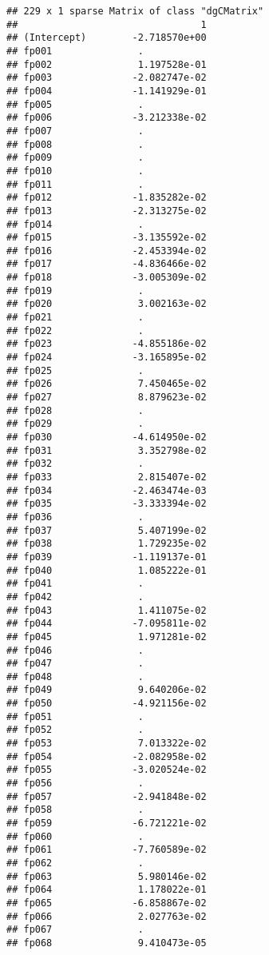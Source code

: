 \documentclass[]{article}
\begin{document}
\begin{verbatim}
## 229 x 1 sparse Matrix of class "dgCMatrix"
##                                1
## (Intercept)        -2.718570e+00
## fp001               .           
## fp002               1.197528e-01
## fp003              -2.082747e-02
## fp004              -1.141929e-01
## fp005               .           
## fp006              -3.212338e-02
## fp007               .           
## fp008               .           
## fp009               .           
## fp010               .           
## fp011               .           
## fp012              -1.835282e-02
## fp013              -2.313275e-02
## fp014               .           
## fp015              -3.135592e-02
## fp016              -2.453394e-02
## fp017              -4.836466e-02
## fp018              -3.005309e-02
## fp019               .           
## fp020               3.002163e-02
## fp021               .           
## fp022               .           
## fp023              -4.855186e-02
## fp024              -3.165895e-02
## fp025               .           
## fp026               7.450465e-02
## fp027               8.879623e-02
## fp028               .           
## fp029               .           
## fp030              -4.614950e-02
## fp031               3.352798e-02
## fp032               .           
## fp033               2.815407e-02
## fp034              -2.463474e-03
## fp035              -3.333394e-02
## fp036               .           
## fp037               5.407199e-02
## fp038               1.729235e-02
## fp039              -1.119137e-01
## fp040               1.085222e-01
## fp041               .           
## fp042               .           
## fp043               1.411075e-02
## fp044              -7.095811e-02
## fp045               1.971281e-02
## fp046               .           
## fp047               .           
## fp048               .           
## fp049               9.640206e-02
## fp050              -4.921156e-02
## fp051               .           
## fp052               .           
## fp053               7.013322e-02
## fp054              -2.082958e-02
## fp055              -3.020524e-02
## fp056               .           
## fp057              -2.941848e-02
## fp058               .           
## fp059              -6.721221e-02
## fp060               .           
## fp061              -7.760589e-02
## fp062               .           
## fp063               5.980146e-02
## fp064               1.178022e-01
## fp065              -6.858867e-02
## fp066               2.027763e-02
## fp067               .           
## fp068               9.410473e-05

\end{verbatim}
\end{document}
